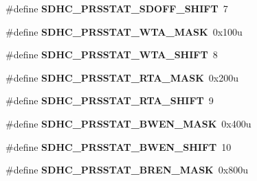 \begin{DoxyCompactItemize}
\item 
\#define {\bfseries S\+D\+H\+C\+\_\+\+P\+R\+S\+S\+T\+A\+T\+\_\+\+S\+D\+O\+F\+F\+\_\+\+S\+H\+I\+FT}~7\hypertarget{group__SDHC__Register__Masks_ga8a5f8108789275435c30d3997c194b12}{}\label{group__SDHC__Register__Masks_ga8a5f8108789275435c30d3997c194b12}

\item 
\#define {\bfseries S\+D\+H\+C\+\_\+\+P\+R\+S\+S\+T\+A\+T\+\_\+\+W\+T\+A\+\_\+\+M\+A\+SK}~0x100u\hypertarget{group__SDHC__Register__Masks_gae6ab1f30d29da8d10ad0985318d09c30}{}\label{group__SDHC__Register__Masks_gae6ab1f30d29da8d10ad0985318d09c30}

\item 
\#define {\bfseries S\+D\+H\+C\+\_\+\+P\+R\+S\+S\+T\+A\+T\+\_\+\+W\+T\+A\+\_\+\+S\+H\+I\+FT}~8\hypertarget{group__SDHC__Register__Masks_ga52a878b9915b1b1dd257b24abb21a33f}{}\label{group__SDHC__Register__Masks_ga52a878b9915b1b1dd257b24abb21a33f}

\item 
\#define {\bfseries S\+D\+H\+C\+\_\+\+P\+R\+S\+S\+T\+A\+T\+\_\+\+R\+T\+A\+\_\+\+M\+A\+SK}~0x200u\hypertarget{group__SDHC__Register__Masks_gad374f3cdffc3be8138708bf632b303be}{}\label{group__SDHC__Register__Masks_gad374f3cdffc3be8138708bf632b303be}

\item 
\#define {\bfseries S\+D\+H\+C\+\_\+\+P\+R\+S\+S\+T\+A\+T\+\_\+\+R\+T\+A\+\_\+\+S\+H\+I\+FT}~9\hypertarget{group__SDHC__Register__Masks_gaad64c483eb2e6b6fc96cd466772b1af5}{}\label{group__SDHC__Register__Masks_gaad64c483eb2e6b6fc96cd466772b1af5}

\item 
\#define {\bfseries S\+D\+H\+C\+\_\+\+P\+R\+S\+S\+T\+A\+T\+\_\+\+B\+W\+E\+N\+\_\+\+M\+A\+SK}~0x400u\hypertarget{group__SDHC__Register__Masks_ga59c9cd5ee08a703b51a4487e721cfdac}{}\label{group__SDHC__Register__Masks_ga59c9cd5ee08a703b51a4487e721cfdac}

\item 
\#define {\bfseries S\+D\+H\+C\+\_\+\+P\+R\+S\+S\+T\+A\+T\+\_\+\+B\+W\+E\+N\+\_\+\+S\+H\+I\+FT}~10\hypertarget{group__SDHC__Register__Masks_ga2a8af22b9f8230f46db9118a7f4a2f62}{}\label{group__SDHC__Register__Masks_ga2a8af22b9f8230f46db9118a7f4a2f62}

\item 
\#define {\bfseries S\+D\+H\+C\+\_\+\+P\+R\+S\+S\+T\+A\+T\+\_\+\+B\+R\+E\+N\+\_\+\+M\+A\+SK}~0x800u\hypertarget{group__SDHC__Register__Masks_ga9a1a3466ff4e6ec9067956296e917ebf}{}\label{group__SDHC__Register__Masks_ga9a1a3466ff4e6ec9067956296e917ebf}


\end{DoxyCompactItemize}

